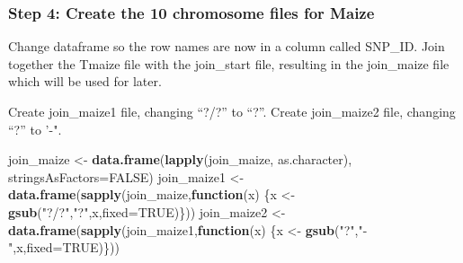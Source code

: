 \documentclass[]{article}
\newenvironment{Shaded}{\begin{snugshade}}{\end{snugshade}}
\newcommand{\ControlFlowTok}[1]{\textcolor[rgb]{0.13,0.29,0.53}{\textbf{#1}}}
\newcommand{\DataTypeTok}[1]{\textcolor[rgb]{0.13,0.29,0.53}{#1}}
\newcommand{\KeywordTok}[1]{\textcolor[rgb]{0.13,0.29,0.53}{\textbf{#1}}}
\newcommand{\NormalTok}[1]{#1}
\newcommand{\OperatorTok}[1]{\textcolor[rgb]{0.81,0.36,0.00}{\textbf{#1}}}
\newcommand{\OtherTok}[1]{\textcolor[rgb]{0.56,0.35,0.01}{#1}}
\newcommand{\StringTok}[1]{\textcolor[rgb]{0.31,0.60,0.02}{#1}}
\begin{document}
\begin{Shaded}
\end{Shaded}

\hypertarget{step-4-create-the-10-chromosome-files-for-maize}{%
\subsubsection{Step 4: Create the 10 chromosome files for
Maize}\label{step-4-create-the-10-chromosome-files-for-maize}}

Change dataframe so the row names are now in a column called SNP\_ID.
Join together the Tmaize file with the join\_start file, resulting in
the join\_maize file which will be used for later.

Create join\_maize1 file, changing ``?/?'' to ``?''. Create join\_maize2
file, changing ``?'' to '-".

\begin{Shaded}
\begin{Highlighting}[]
\NormalTok{join_maize <-}\StringTok{ }\KeywordTok{data.frame}\NormalTok{(}\KeywordTok{lapply}\NormalTok{(join_maize, as.character),}
                            \DataTypeTok{stringsAsFactors=}\OtherTok{FALSE}\NormalTok{)}
\NormalTok{join_maize1 <-}\StringTok{ }\KeywordTok{data.frame}\NormalTok{(}\KeywordTok{sapply}\NormalTok{(join_maize,}\ControlFlowTok{function}\NormalTok{(x) }
\NormalTok{                  \{x <-}\StringTok{ }\KeywordTok{gsub}\NormalTok{(}\StringTok{"?/?"}\NormalTok{,}\StringTok{"?"}\NormalTok{,x,}\DataTypeTok{fixed=}\OtherTok{TRUE}\NormalTok{)\}))}
\NormalTok{join_maize2 <-}\StringTok{ }\KeywordTok{data.frame}\NormalTok{(}\KeywordTok{sapply}\NormalTok{(join_maize1,}\ControlFlowTok{function}\NormalTok{(x) }
\NormalTok{                  \{x <-}\StringTok{ }\KeywordTok{gsub}\NormalTok{(}\StringTok{"?"}\NormalTok{,}\StringTok{"-"}\NormalTok{,x,}\DataTypeTok{fixed=}\OtherTok{TRUE}\NormalTok{)\}))}
\end{Highlighting}
\end{Shaded}
\end{document}
